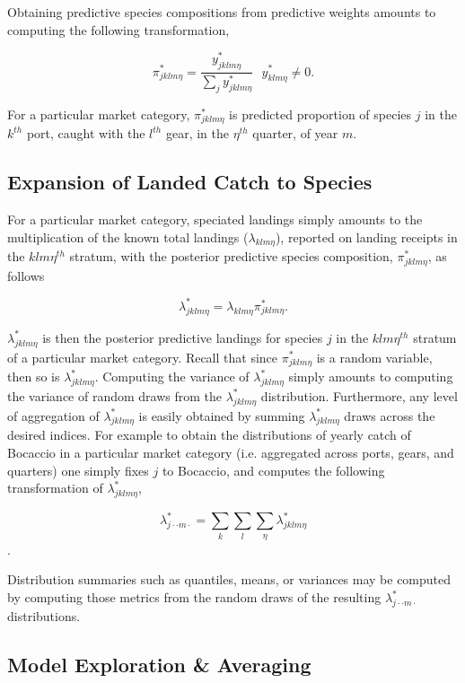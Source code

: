 \documentclass[12pt]{article}
\begin{document}
Obtaining predictive species compositions from predictive weights
amounts to computing the following transformation,

\[\pi^*_{jklm\eta} = \frac{y^*_{jklm\eta}}{\sum_j y^*_{jklm\eta}} ~~~ y^*_{klm\eta}\neq 0.\]

For a particular market category, \(\pi^*_{jklm\eta}\) is predicted
proportion of species \(j\) in the \(k^{th}\) port, caught with the
\(l^{th}\) gear, in the \(\eta^{th}\) quarter, of year \(m\).

\subsection{Expansion of Landed Catch to Species}\label{expansion}

For a particular market category, speciated landings simply amounts to
the multiplication of the known total landings (\(\lambda_{klm\eta}\)),
reported on landing receipts in the \(klm\eta^{th}\) stratum, with the
posterior predictive species composition, \(\pi^*_{jklm\eta}\), as follows

\[\lambda^*_{jklm\eta} = \lambda_{klm\eta}\pi^*_{jklm\eta}.\]

\(\lambda^*_{jklm\eta}\) is then the posterior predictive landings for
species \(j\) in the \(klm\eta^{th}\) stratum of a particular market
category. Recall that since \(\pi^*_{jklm\eta}\) is a random variable,
then so is \(\lambda^*_{jklm\eta}\). Computing the variance of
\(\lambda^*_{jklm\eta}\) simply amounts to computing the variance of
random draws from the \(\lambda^*_{jklm\eta}\) distribution.
Furthermore, any level of aggregation of \(\lambda^*_{jklm\eta}\) is
easily obtained by summing \(\lambda^*_{jklm\eta}\) draws across the
desired indices. For example to obtain the distributions of yearly catch
of Bocaccio in a particular market category (i.e. aggregated across ports, 
gears, and quarters) one simply fixes $j$ to Bocaccio, and computes the 
following transformation of \(\lambda^*_{jklm\eta}\),

\[\lambda^*_{j\cdot\cdot m\cdot} =\sum_{k}\sum_{l}\sum_{\eta}\lambda^*_{jklm\eta}\].

Distribution summaries such as quantiles, means, or variances may be
computed by computing those metrics from the random draws of the
resulting \(\lambda^*_{j\cdot\cdot m\cdot}\) distributions.

\subsection{Model Exploration \& Averaging}\label{model-exploration-averaging}
\end{document}

